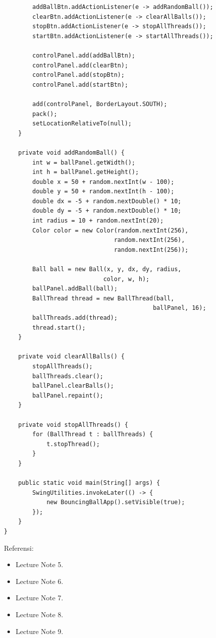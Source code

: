\documentclass[a4paper]{article}
\begin{document}
\begin{enumerate}[itemsep=1em]
\begin{enumerate}[itemsep=1em]
\begin{verbatim}
        addBallBtn.addActionListener(e -> addRandomBall());
        clearBtn.addActionListener(e -> clearAllBalls());
        stopBtn.addActionListener(e -> stopAllThreads());
        startBtn.addActionListener(e -> startAllThreads());

        controlPanel.add(addBallBtn);
        controlPanel.add(clearBtn);
        controlPanel.add(stopBtn);
        controlPanel.add(startBtn);

        add(controlPanel, BorderLayout.SOUTH);
        pack();
        setLocationRelativeTo(null);
    }

    private void addRandomBall() {
        int w = ballPanel.getWidth();
        int h = ballPanel.getHeight();
        double x = 50 + random.nextInt(w - 100);
        double y = 50 + random.nextInt(h - 100);
        double dx = -5 + random.nextDouble() * 10;
        double dy = -5 + random.nextDouble() * 10;
        int radius = 10 + random.nextInt(20);
        Color color = new Color(random.nextInt(256),
                               random.nextInt(256),
                               random.nextInt(256));

        Ball ball = new Ball(x, y, dx, dy, radius, 
                            color, w, h);
        ballPanel.addBall(ball);
        BallThread thread = new BallThread(ball, 
                                          ballPanel, 16);
        ballThreads.add(thread);
        thread.start();
    }

    private void clearAllBalls() {
        stopAllThreads();
        ballThreads.clear();
        ballPanel.clearBalls();
        ballPanel.repaint();
    }

    private void stopAllThreads() {
        for (BallThread t : ballThreads) {
            t.stopThread();
        }
    }

    public static void main(String[] args) {
        SwingUtilities.invokeLater(() -> {
            new BouncingBallApp().setVisible(true);
        });
    }
}
    \end{verbatim}
  \end{enumerate}
\end{enumerate}

Referensi:

\begin{itemize}
  \item Lecture Note 5.
  \item Lecture Note 6.
  \item Lecture Note 7.
  \item Lecture Note 8.
  \item Lecture Note 9.
\end{itemize}
\end{document}
